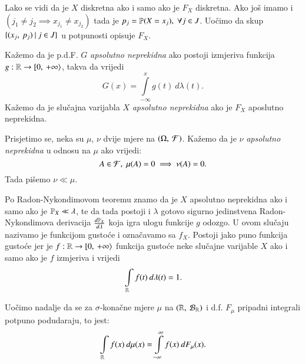 Lako se vidi da je $X$ diskretna ako i samo ako je $F_X$ diskretna.
Ako jo\v s imamo i $(j_1 \neq j_2 \implies x_{j_1} \neq x_{j_2})$ tada je $p_j = \mathbb{P}({X = x_j}), \; \forall j \in J$.
Uo\v cimo da skup $\{{({x_j}, \: {p_j})} \: | \: {j \in J}\}$ u potpunosti opisuje $F_X$.

\begin{defn}    \label{defn:5.11-2}
Ka\v zemo da je p.d.F. $G$ \emph{apsolutno neprekidna} ako postoji izmjeriva funkcija $g : \mathbb{R} \to [ {0}, \: {+\infty} \rangle$, takva da vrijedi
\begin{equation*}
    G(x) = \int\limits_{-\infty}^{x} g(t) \: d \lambda (t).
\end{equation*}
Ka\v zemo da je slu\v cajna varijabla $X$ \emph{apsolutno neprekidna} ako je $F_X$ aposlutno neprekidna.
\end{defn}

\begin{nap} \label{nap:5.11-3}
    Prisjetimo se, neka su $\mu$, $\nu$ dvije mjere na $(\Omega, \: \mathcal{F})$. Ka\v zemo da je $\nu$ \emph{apsolutno neprekidna} u odnosu na $\mu$ ako vrijedi:
    \begin{equation*}
        A \in \mathcal{F}, \; \mu(A) = 0 \implies \nu (A) = 0.
    \end{equation*}
    Tada pi\v semo $\nu \ll \mu$.
\end{nap}

Po Radon-Nykondimovom teoremu znamo da je $X$ apsolutno neprekidna ako i samo ako je $\mathbb{P}_X \ll \lambda$, te da tada postoji i $\lambda$ gotovo sigurno jedinstvena Radon-Nykondimova derivacija $\frac{d \mathbb{P}_X}{d \lambda}$ koja igra ulogu funkcije $g$ odozgo.
U ovom slu\v caju nazivamo je funkcijom gusto\' ce i ozna\v cavamo sa $f_X$.
Postoji jako puno funkcija gusto\' ce jer je $f: \mathbb{R} \to [ {0}, \: {+\infty} \rangle$ funkcija gusto\' ce neke slu\v cajne varijable $X$ ako i samo ako je $f$ izmjeriva i vrijedi
\begin{equation*}
    \int\limits_{\mathbb{R}} f(t) \: d \lambda (t) = 1.
\end{equation*}

Uo\v cimo nadalje da se za $\sigma$-kona\v cne mjere $\mu$ na $({\mathbb{R}}, \: {\mathcal{B}_{\mathbb{R}}})$ i d.f. $F_{\mu}$ pripadni integrali potpuno podudaraju, to jest:
\begin{equation*}
    \int\limits_{\mathbb{R}} f(x) \: d \mu (x) = \int\limits_{-\infty}^{\infty} f(x) \: d F_{\mu} (x).
\end{equation*}

